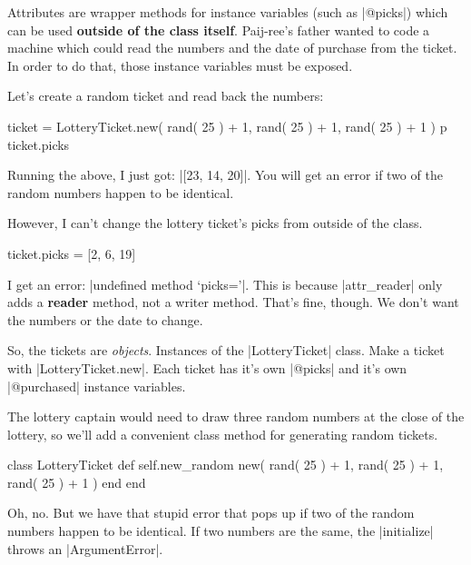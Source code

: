\documentclass[12pt,twoside]{report}
\begin{document}
Attributes are wrapper methods for instance variables (such as
\rubyinline|@picks|) which can be used {\bf outside of
  the class itself}.  Paij-ree's father wanted to code a machine which
could read the numbers and the date of purchase from the ticket.  In
order to do that, those instance variables must be exposed.

Let's create a random ticket and read back the numbers:


\begin{rubycode}

 ticket = LotteryTicket.new( rand( 25 ) + 1,
             rand( 25 ) + 1, rand( 25 ) + 1 )
 p ticket.picks

\end{rubycode}


Running the above, I just got: 
\rubyinline|[23, 14, 20]|.  
You will get an error if two of the random numbers happen to
be identical.

However, I can't change the lottery ticket's picks from outside of the
class.


\begin{rubycode}

 ticket.picks = [2, 6, 19]

\end{rubycode}


I get an error: 
\rubyinline|undefined method `picks='|. 
This is because \rubyinline|attr_reader|
only adds a {\bf reader} method, not a writer method. That's fine,
though.  We don't want the numbers or the date to change.

So, the tickets are {\em objects}.  Instances of the
\rubyinline|LotteryTicket| class.  Make a ticket with
\rubyinline|LotteryTicket.new|.  Each ticket has it's
own \rubyinline|@picks| and it's own
\rubyinline|@purchased| instance variables.

The lottery captain would need to draw three random numbers at the
close of the lottery, so we'll add a convenient class method for
generating random tickets.


\begin{rubycode}

 class LotteryTicket
   def self.new_random
     new( rand( 25 ) + 1, rand( 25 ) + 1, rand( 25 ) + 1 )
   end
 end

\end{rubycode}


Oh, no.  But we have that stupid error that pops up if two of the
random numbers happen to be identical.  If two numbers are the same,
the \rubyinline|initialize| throws an
\rubyinline|ArgumentError|.
\end{document}
